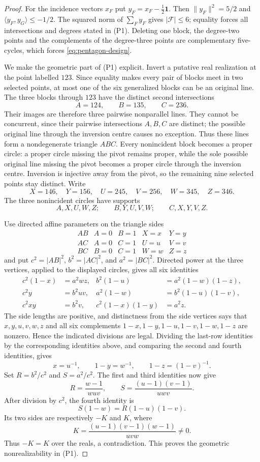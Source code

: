 \begin{proof}
For the incidence vectors $x_F$ put $y_F=x_F-\frac12\mathbf1$.  Then
$\|y_F\|^2=5/2$ and $\langle y_F,y_G\rangle\le-1/2$.  The squared norm of
$\sum_Fy_F$ gives $|\mathcal F|\le6$; equality forces all intersections and
degrees stated in (P1).  Deleting one block, the degree-two points and the
complements of the degree-three points are complementary five-cycles,
which forces \eqref{eq:pentagon-design}.

We make the geometric part of (P1) explicit.  Invert a putative real
realization at the point labelled $123$.  Since equality makes every pair
of blocks meet in two selected points, at most one of the six generalized
blocks can be an original line.  The three blocks through $123$ have the
distinct second intersections
\[
 A=124,\qquad B=135,\qquad C=236.
\]
Their images are therefore three pairwise nonparallel lines.  They cannot
be concurrent, since their pairwise intersections $A,B,C$ are distinct;
the possible original line through the inversion centre causes no
exception.  Thus these lines form a nondegenerate triangle $ABC$.  Every
nonincident block becomes a proper circle: a proper circle missing the
pivot remains proper, while the sole possible original line missing the
pivot becomes a proper circle through the inversion centre.  Inversion is
injective away from the pivot, so the remaining nine selected points stay
distinct.  Write
\[
 X=146,\quad Y=156,\quad U=245,\quad V=256,
 \quad W=345,\quad Z=346.
\]
The three nonincident circles have supports
\[
 A,X,U,W,Z;\qquad B,Y,U,V,W;\qquad C,X,Y,V,Z.
\]

Use directed affine parameters on the triangle sides
\[
 \begin{array}{c|cccc}
 AB&A=0&B=1&X=x&Y=y\\
 AC&A=0&C=1&U=u&V=v\\
 BC&B=0&C=1&W=w&Z=z
 \end{array}
\]
and put $c^2=|AB|^2$, $b^2=|AC|^2$, and $a^2=|BC|^2$.
Directed power at the three vertices, applied to the displayed circles,
gives all six identities
\begin{align*}
 c^2(1-x)&=a^2wz,&
 b^2(1-u)&=a^2(1-w)(1-z),\\
 c^2y&=b^2uv,&
 a^2(1-w)&=b^2(1-u)(1-v),\\
 c^2xy&=b^2v,&
 c^2(1-x)(1-y)&=a^2z.
\end{align*}
The side lengths are positive, and distinctness from the side vertices says
that $x,y,u,v,w,z$ and all six complements
$1-x,1-y,1-u,1-v,1-w,1-z$ are nonzero.  Hence the indicated divisions are
legal.  Dividing the last-row identities by the corresponding identities
above, and comparing the second and fourth identities, gives
\[
 x=u^{-1},\qquad 1-y=w^{-1},\qquad 1-z=(1-v)^{-1}.
\]
Set $R=b^2/c^2$ and $S=a^2/c^2$.  The first and third identities now give
\[
 R=\frac{w-1}{wuv},\qquad
 S=\frac{(u-1)(v-1)}{uwv}.
\]
After division by $c^2$, the fourth identity is
\[
 S(1-w)=R(1-u)(1-v).
\]
Its two sides are respectively $-K$ and $K$, where
\[
 K=\frac{(u-1)(v-1)(w-1)}{uvw}\ne0.
\]
Thus $-K=K$ over the reals, a contradiction.  This proves the geometric
nonrealizability in (P1).


\end{proof}
